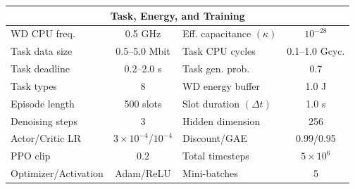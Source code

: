 \documentclass[journal]{IEEEtran}
\begin{document}
\begin{table}[!ht]
{\begin{tabular}{|l|c|l|c|}
\multicolumn{4}{|c|}{\cellcolor{blue!8}\textbf{Task, Energy, and Training}} \\ \hline
WD CPU freq. & 0.5 GHz &
Eff. capacitance $(\kappa)$ & $10^{-28}$ \\ \hline
Task data size & 0.5--5.0 Mbit &
Task CPU cycles & 0.1--1.0 Gcyc. \\ \hline
Task deadline & 0.2--2.0 s &
Task gen. prob. & 0.7 \\ \hline
Task types & 8 &
WD energy buffer & 1.0 J \\ \hline
Episode length & 500 slots &
Slot duration $(\Delta t)$ & 1.0 s \\ \hline
Denoising steps & 3 &
Hidden dimension & 256 \\ \hline
Actor/Critic LR & $3{\times}10^{-4}$/$10^{-4}$ &
Discount/GAE & 0.99/0.95 \\ \hline
PPO clip & 0.2 &
Total timesteps & $5{\times}10^{6}$ \\ \hline
Optimizer/Activation & Adam/ReLU &
Mini-batches & 5 \\ \hline

\end{tabular}}
\end{table}
\end{document}
